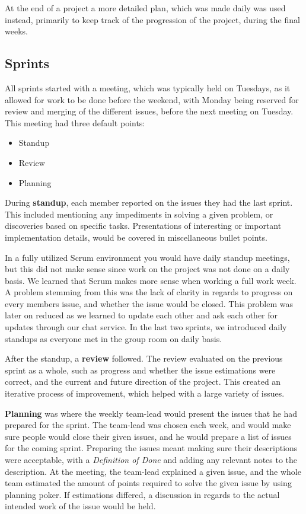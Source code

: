 At the end of a project a more detailed plan, which was made daily was used instead, primarily to keep track of the progression of the project, during the final weeks.

\subsection{Sprints}
All sprints started with a meeting, which was typically held on Tuesdays, as it allowed for work to be done before the weekend, with Monday being reserved for review and merging of the different issues, before the next meeting on Tuesday.
This meeting had three default points:
\begin{itemize}
	\item Standup
	\item Review
	\item Planning
\end{itemize}

During \textbf{standup}, each member reported on the issues they had the last sprint.
This included mentioning any impediments in solving a given problem, or discoveries based on specific tasks.
Presentations of interesting or important implementation details, would be covered in miscellaneous bullet points.

In a fully utilized Scrum environment you would have daily standup meetings, but this did not make sense since work on the project was not done on a daily basis.
We learned that Scrum makes more sense when working a full work week.
A problem stemming from this was the lack of clarity in regards to progress on every members issue, and whether the issue would be closed.
This problem was later on reduced as we learned to update each other and ask each other for updates through our chat service.
In the last two sprints, we introduced daily standups as everyone met in the group room on daily basis.

After the standup, a \textbf{review} followed.
The review evaluated on the previous sprint as a whole, such as progress and whether the issue estimations were correct, and the current and future direction of the project.
This created an iterative process of improvement, which helped with a large variety of issues.

\textbf{Planning} was where the weekly team-lead would present the issues that he had prepared for the sprint. 
The team-lead was chosen each week, and would make sure people would close their given issues, and he would prepare a list of issues for the coming sprint.
Preparing the issues meant making sure their descriptions were acceptable, with a \textit{Definition of Done} and adding any relevant notes to the description.
At the meeting, the team-lead explained a given issue, and the whole team estimated the amount of points required to solve the given issue by using planning poker.
If estimations differed, a discussion in regards to the actual intended work of the issue would be held. 

